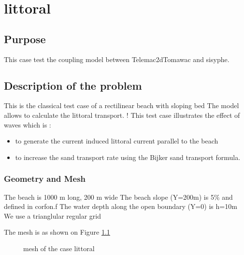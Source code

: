 \chapter{littoral}
%

%
\section{Purpose}
%
This case test the coupling model between Telemac2dTomawac and sisyphe.
%
\section{Description of the problem}
%
This is the classical test case of a rectilinear beach with sloping bed
The model allows to calculate the littoral transport.
! 
This test case illustrates the effect of waves which is :
\begin{itemize}
\item to generate the current induced littoral current parallel to the beach
\item to increase the sand transport rate using the Bijker sand transport formula.
  \end{itemize}

%
%
%

%
%
\subsection{Geometry and Mesh}
%
The beach is 1000 m long, 200 m wide
 The beach slope (Y=200m) is 5\% and defined in corfon.f
 The water depth along the open boundary (Y=0) is h=10m
We use a trianglular regular grid 


The mesh is as shown on Figure \ref{littoralmesh}
\begin{figure} [!h]
\centering
{}
 \caption{mesh of the case littoral}
\label{littoralmesh}
\end{figure}

